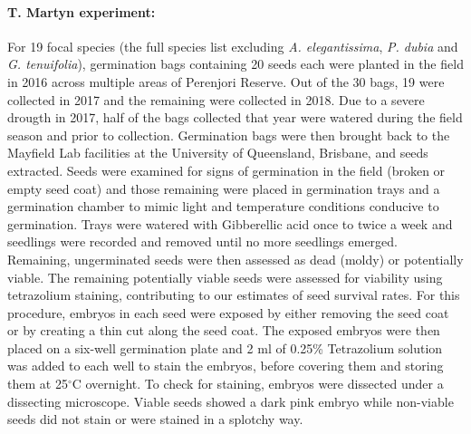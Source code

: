 \documentclass[a4,12pt]{article}
\begin{document}
        \paragraph{T. Martyn experiment:}
        For 19 focal species (the full species list excluding \textit{A. elegantissima}, \textit{P. dubia} and \textit{G. tenuifolia}), germination bags containing 20 seeds each were planted in the field in 2016 across multiple areas of Perenjori Reserve. Out of the 30 bags, 19 were collected in 2017 and the remaining were collected in 2018. Due to a severe drougth in 2017, half of the bags collected that year were watered during the field season and prior to collection. Germination bags were then brought back to the Mayfield Lab facilities at the University of Queensland, Brisbane, and seeds extracted. Seeds were examined for signs of germination in the field (broken or empty seed coat) and those remaining were placed in germination trays and a germination chamber to mimic light and temperature conditions conducive to germination. Trays were watered with Gibberellic acid once to twice a week and seedlings were recorded and removed until no more seedlings emerged. Remaining, ungerminated seeds were then assessed as dead (moldy) or potentially viable. The remaining potentially viable seeds were assessed for viability using tetrazolium staining, contributing to our estimates of seed survival rates. For this procedure, embryos in each seed were exposed by either removing the seed coat or by creating a thin cut along the seed coat. The exposed embryos were then placed on a six-well germination plate and 2 ml of 0.25\% Tetrazolium solution was added to each well to stain the embryos, before covering them and storing them at 25$^{\circ}$C overnight. To check for staining, embryos were dissected under a dissecting microscope. Viable seeds showed a dark pink embryo while non-viable seeds did not stain or were stained in a splotchy way.
\end{document}
